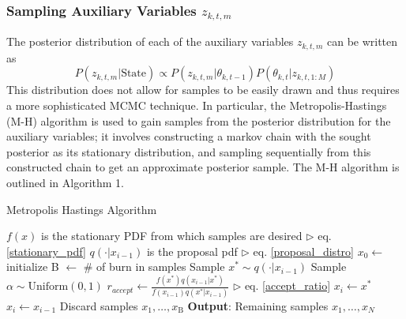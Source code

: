 \documentclass[smallcondensed, final]{svjour3}
\newcommand{\willie}[1]{\textcolor{green}{\textsf{\emph{\textbf{\textcolor{green}{#1}}}}}}
\begin{document}

\subsubsection{Sampling Auxiliary Variables $z_{k,t,m}$}
The posterior distribution of each of the auxiliary variables $z_{k,t,m}$ can be written as
\begin{equation}
\label{stationary_pdf}
P(z_{k,t,m} | \text{State}) \propto  P(z_{k,t,m} | \theta_{k,t-1}) P(\theta_{k,t} | z_{k,t,1:M})
\end{equation}
This distribution does not allow for samples to be easily drawn and thus requires a more sophisticated MCMC technique. In particular, the Metropolis-Hastings (M-H) algorithm is used to gain samples from the posterior distribution for the auxiliary variables; it involves constructing a markov chain with the sought posterior as its stationary distribution, and sampling sequentially from this constructed chain to get an approximate posterior sample. The M-H algorithm is outlined in Algorithm 1.%

\begin{algorithm}[h!]
\label{alg:MH}
\caption{Metropolis Hastings Algorithm}
\begin{algorithmic}[1]
\STATE $f(x)$ is the stationary PDF from which samples are desired \hfill $\triangleright$ eq. \eqref{stationary_pdf}
\STATE $q( \cdot | x_{i-1})$ is the proposal pdf \hfill $\triangleright$ eq. \eqref{proposal_distro}
\STATE $x_{0} \leftarrow$ initialize
\STATE B $\leftarrow$ \# of burn in samples
\STATE Sample $x^{*} \sim q( \cdot | x_{i-1})$
\STATE Sample $\alpha \sim \text{Uniform}(0,1)$
\STATE $r_{accept} \leftarrow \frac{f(x^{*})q(x_{i-1} | x^{*})} {f(x_{i-1})q(x^{*} | x_{i-1})} $ \hfill $\triangleright$  eq. \eqref{accept_ratio}
\STATE $x_{i} \leftarrow x^{*}$
\ELSE
\STATE $x_{i} \leftarrow x_{i-1}$
\ENDIF
\ENDFOR
\STATE Discard samples $x_{1}, \ldots, x_{\text{B}}$
\STATE \textbf{Output}: Remaining samples $x_{1}, \ldots, x_{N}$
\end{algorithmic}
\end{algorithm}
\end{document}
